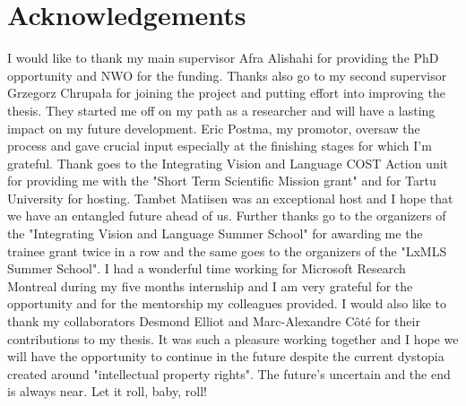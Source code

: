 {}

\chapter*{Acknowledgements}

I would like to thank my main supervisor Afra Alishahi for providing the PhD opportunity 
and NWO for the funding. Thanks also go to my second supervisor Grzegorz Chrupała for joining the project
and putting effort into improving the thesis. 
They started me off on my path as a researcher and will have a lasting 
impact on my future development.
Eric Postma, my promotor, oversaw the process and gave crucial input especially at the finishing stages
for which I'm grateful. Thank goes to the Integrating Vision and Language COST Action unit for providing me with the
"Short Term Scientific Mission grant" and for Tartu University for hosting. 
Tambet Matiisen was an exceptional host and I hope that we have an entangled future ahead of us.
Further thanks go to the organizers of the "Integrating Vision and Language Summer School" for 
awarding me the trainee grant twice in a row and the same goes to the organizers of the "LxMLS Summer School". 
I had a wonderful time working for Microsoft Research Montreal during my five months internship
and I am very grateful for the opportunity and for the mentorship my colleagues provided.
I would also like to thank my collaborators Desmond Elliot and Marc-Alexandre Côté for their contributions
to my thesis. It was such a pleasure working together and I hope we will have the opportunity to continue in the
future despite the current dystopia created around "intellectual property rights".
The future's uncertain and the end is always near. Let it roll, baby, roll!








